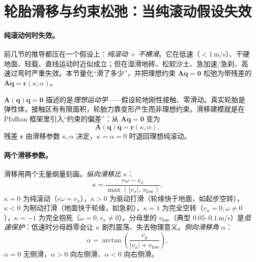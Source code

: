 \section{轮胎滑移与约束松弛：当纯滚动假设失效}
\label{sec:mw-slip}

\paragraph{纯滚动何时失效。}
前几节的推导都压在一个假设上：\emph{纯滚动 $+$ 不横滑}。它在低速（$<1$\,m/s）、干硬地面、轻载、直线运动时近似成立；但在湿滑地砖、松软沙土、急加速/急刹、高速过弯时严重失效。本节量化“滑了多少”，并把理想约束 $\mathbf{A}\dot{\mathbf{q}}=\mathbf{0}$ 松弛为带残差的 $\mathbf{A}\dot{\mathbf{q}}=\mathbf{r}(\kappa,\alpha)$。

\begin{insight}[滑移 = Pfaffian 约束的残差]\label{ins:mw-residual}
$\mathbf{A}(\mathbf{q})\dot{\mathbf{q}}=\mathbf{0}$ 描述的是\emph{理想运动学}——假设轮地刚性接触、零滑动。真实轮胎是弹性体，接触区有有限面积，轮胎力靠变形产生而非理想约束。滑移建模就是在 Pfaffian 框架里引入“约束的偏差”：从 $\mathbf{A}\dot{\mathbf{q}}=\mathbf{0}$ 变为
\begin{equation}
  \mathbf{A}(\mathbf{q})\dot{\mathbf{q}}=\mathbf{r}(\kappa,\alpha),
  \label{eq:mw-A-residual}
\end{equation}
残差 $\mathbf{r}$ 由滑移参数 $\kappa,\alpha$ 决定，$\kappa=\alpha=0$ 时退回理想纯滚动。
\end{insight}

\paragraph{两个滑移参数。}
滑移用两个无量纲量刻画。\emph{纵向滑移比} $\kappa$：
\begin{equation}
  \kappa=\frac{r\omega-v_x}{\max(|v_x|,\,v_{\text{low}})},
  \label{eq:mw-kappa}
\end{equation}
$\kappa=0$ 为纯滚动（$r\omega=v_x$），$\kappa>0$ 为驱动打滑（轮缘快于地面，如起步空转），$\kappa<0$ 为制动打滑（地面快于轮缘，如急刹），$\kappa=1$ 为完全空转（$v_x=0,\omega\neq0$），$\kappa=-1$ 为完全抱死（$\omega=0,v_x\neq0$）。分母里的 $v_{\text{low}}$（典型 $0.05$–$0.1$\,m/s）是\emph{低速保护}：低速时分母趋零会让 $\kappa$ 剧烈震荡、失去物理意义。\emph{侧向滑移角} $\alpha$：
\begin{equation}
  \alpha=\arctan\!\left(\frac{v_y}{|v_x|+v_{\text{low}}}\right),
  \label{eq:mw-alpha}
\end{equation}
$\alpha=0$ 无侧滑，$\alpha>0$ 向左侧滑、$\alpha<0$ 向右侧滑。

